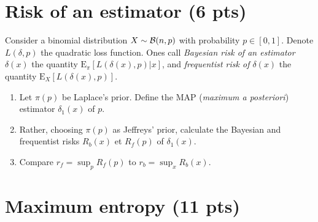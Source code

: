 \documentclass[10pt]{article}
\newcommand{\E}{\mbox{E}}
\newcommand{\1}{\mathbbm{1}}
\begin{document}
\section{Risk of an estimator (6 pts)}

Consider a binomial distribution $X\sim{\cal{B}}(n,p)$ with probability $p\in[0,1]$. Denote $L(\delta,p)$ the quadratic loss function. Ones call  {\it Bayesian risk of an estimator $\delta(x)$} the quantity $\E_{\pi}[L(\delta(x),p)|x]$, and  {\it frequentist risk of $\delta(x)$}  the quantity $\E_{X}[L(\delta(x),p)]$.
\begin{enumerate}
\item Let $\pi(p)$ be Laplace's prior. Define the  MAP ({\it maximum a posteriori}) estimator $\delta_1(x)$ of $p$.
\item Rather, choosing $\pi(p)$ as Jeffreys' prior, calculate the Bayesian and frequentist risks $R_b(x)$ et $R_f(p)$ of  $\delta_1(x)$.
\item Compare $r_f = \sup_p R_f(p)$ to 
$r_b  =  \sup_x R_b(x)$. 
\end{enumerate}


\section{Maximum entropy (11 pts)}\label{max.entropie}
\end{document}

